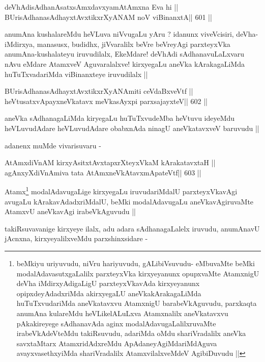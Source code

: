 \begin{shl}
deVhAdisAdhanAsatxsAmxdavxyamAtAmxna Eva hi ||
BUrisAdhanasAdhayxtAvxtikxrXyANAM noV viBinanxtA\hfill || 601 ||
\end{shl}

\begin{artha}
anumAna kushalareMdu heVLuva niVvugaLu yAru ? idanunx viveVcisiri,
deVha-iMdirxya, manasusx, budidhx, jiVvaralilx beVre beVreyAgi
parxteyxVka anumAna-kushalateyu iruvudilalx, EkeMdare! deVhAdi
sAdhanavuLaLxvaru nAvu eMdare AtamxveV Aguvaralalxve! kirxyegaLu
aneVka kArakagaLiMda huTuTxvadariMda viBinanxteye iruvudilalx ||
\end{artha}

\begin{shl}
BUrisAdhanasAdhayxtAvxtikxrXyANAmiti ceVdaBxveVtf ||
heVtusatxvApayxneVkatavx meVkasAyxpi parxsajayxteV\hfill || 602 ||
\end{shl}

\begin{artha}
aneVka sAdhanagaLiMda kiryegaLu huTuTxvudeMba heVtuvu ideyeMdu
heVLuvudAdare heVLuvudAdare obabxnAda ninagU aneVkatavxveV baruvudu ||

adanenx muMde vivarisuvaru - 
\end{artha}

\begin{shl}
AtAmxdiVnAM kirxyAsitxtAvxtapxrXteyxVkaM kArakatavxtaH ||
agAnxyXdiVnAmiva tata AtAmxneVkAtavxmApateVtf\hfill || 603 ||
\end{shl}

\begin{artha}
Atamx\footnote[1]{beMkiyu uriyuvudu, niVru hariyuvudu, gALibiVsuvudu-
  eMbuvaMte beMki modalAdavasutxgaLalilx parxteyxVka kirxyeyanunx
  opupxvaMte AtamxnigU deVha iMdirxyAdigaLigU parxteyxVkavAda
  kirxyeyanunx opipxdeyAdadxriMda akirxyegaLU aneVkakArakagaLiMda
  huTuTxvudariMda aneVkatavxvu AtamxnigU barabeVkAguvudu, parxkaqta
  anumAna kulareMdu heVLikelALuLxva Atamxnalilx aneVkatavxvu
  pAkakireyege sAdhanavAda aginx modalAdavugaLalilxruvaMte
  irabeVkAdeVteMdu takiRsuvudu, adariMda oMdu shariVradalilx aneVka
  savxtaMtarx AtamxridAdxreMdu ApAdaneyAgiMdariMdAguva
  avayxvasethxyiMda shariVradalilx AtamxvilalxveMdeV AgibiDuvudu ||} modalAdavugaLige kirxyegaLu iruvudariMdalU
parxteyxVkavAgi avugaLu kArakavAdadxriMdalU, beMki modalAdavugaLu
aneVkavAgiruvaMte AtamxvU aneVkavAgi irabeVkAguvudu ||
\end{artha}

\begin{artha}
takiRsuvavanige kirxyeye ilalx, adu adara sAdhanagaLalelx iruvudu,
anumAnavU jAcnxna, kirxyeyalilxveMdu parxshinxsidare -
\end{artha}


